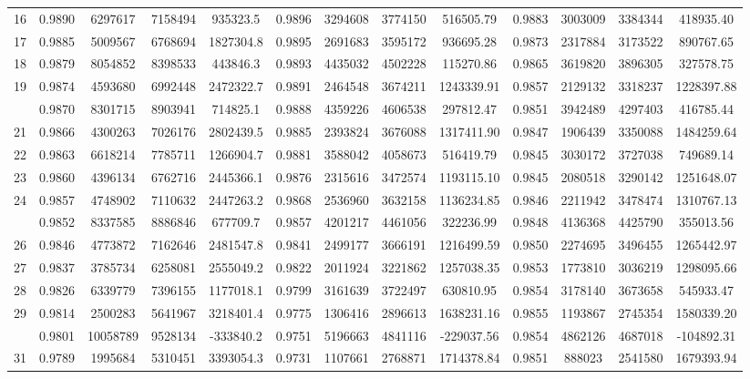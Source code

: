 \documentclass[
  12pt,
]{article}
\begin{document}
\begin{longtable}[t]{lcccccccccccc}
16 & 0.9890 & 6297617 & 7158494 & 935323.5 & 0.9896 & 3294608 & 3774150 & 516505.79 & 0.9883 & 3003009 & 3384344 & 418935.40\\
17 & 0.9885 & 5009567 & 6768694 & 1827304.8 & 0.9895 & 2691683 & 3595172 & 936695.28 & 0.9873 & 2317884 & 3173522 & 890767.65\\
18 & 0.9879 & 8054852 & 8398533 & 443846.3 & 0.9893 & 4435032 & 4502228 & 115270.86 & 0.9865 & 3619820 & 3896305 & 327578.75\\
19 & 0.9874 & 4593680 & 6992448 & 2472322.7 & 0.9891 & 2464548 & 3674211 & 1243339.91 & 0.9857 & 2129132 & 3318237 & 1228397.88\\
\addlinespace
20 & 0.9870 & 8301715 & 8903941 & 714825.1 & 0.9888 & 4359226 & 4606538 & 297812.47 & 0.9851 & 3942489 & 4297403 & 416785.44\\
21 & 0.9866 & 4300263 & 7026176 & 2802439.5 & 0.9885 & 2393824 & 3676088 & 1317411.90 & 0.9847 & 1906439 & 3350088 & 1484259.64\\
22 & 0.9863 & 6618214 & 7785711 & 1266904.7 & 0.9881 & 3588042 & 4058673 & 516419.79 & 0.9845 & 3030172 & 3727038 & 749689.14\\
23 & 0.9860 & 4396134 & 6762716 & 2445366.1 & 0.9876 & 2315616 & 3472574 & 1193115.10 & 0.9845 & 2080518 & 3290142 & 1251648.07\\
24 & 0.9857 & 4748902 & 7110632 & 2447263.2 & 0.9868 & 2536960 & 3632158 & 1136234.85 & 0.9846 & 2211942 & 3478474 & 1310767.13\\
\addlinespace
25 & 0.9852 & 8337585 & 8886846 & 677709.7 & 0.9857 & 4201217 & 4461056 & 322236.99 & 0.9848 & 4136368 & 4425790 & 355013.56\\
26 & 0.9846 & 4773872 & 7162646 & 2481547.8 & 0.9841 & 2499177 & 3666191 & 1216499.59 & 0.9850 & 2274695 & 3496455 & 1265442.97\\
27 & 0.9837 & 3785734 & 6258081 & 2555049.2 & 0.9822 & 2011924 & 3221862 & 1257038.35 & 0.9853 & 1773810 & 3036219 & 1298095.66\\
28 & 0.9826 & 6339779 & 7396155 & 1177018.1 & 0.9799 & 3161639 & 3722497 & 630810.95 & 0.9854 & 3178140 & 3673658 & 545933.47\\
29 & 0.9814 & 2500283 & 5641967 & 3218401.4 & 0.9775 & 1306416 & 2896613 & 1638231.16 & 0.9855 & 1193867 & 2745354 & 1580339.20\\
\addlinespace
30 & 0.9801 & 10058789 & 9528134 & -333840.2 & 0.9751 & 5196663 & 4841116 & -229037.56 & 0.9854 & 4862126 & 4687018 & -104892.31\\
31 & 0.9789 & 1995684 & 5310451 & 3393054.3 & 0.9731 & 1107661 & 2768871 & 1714378.84 & 0.9851 & 888023 & 2541580 & 1679393.94\\

\end{longtable}
\end{document}
